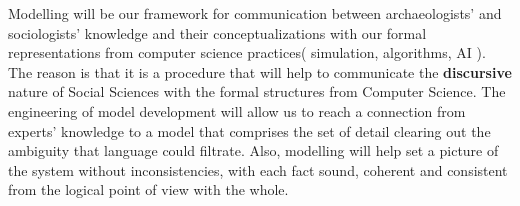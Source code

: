 \documentclass[11pt,oneside,a4paper,openright]{report}
\begin{document}



Modelling will be our framework for communication between archaeologists' and sociologists' knowledge and their conceptualizations with our formal representations from computer science practices( simulation, algorithms, AI ).
The reason is that it is a procedure that will help to communicate the \textbf{discursive} nature of Social Sciences with the formal structures from Computer Science. The engineering of model development will allow us to reach a connection from experts' knowledge to a model that comprises the set of detail clearing out the ambiguity that language could filtrate. Also, modelling will help set a picture of the system without inconsistencies, with each fact sound, coherent and consistent from the logical point of view with the whole.
\end{document}
